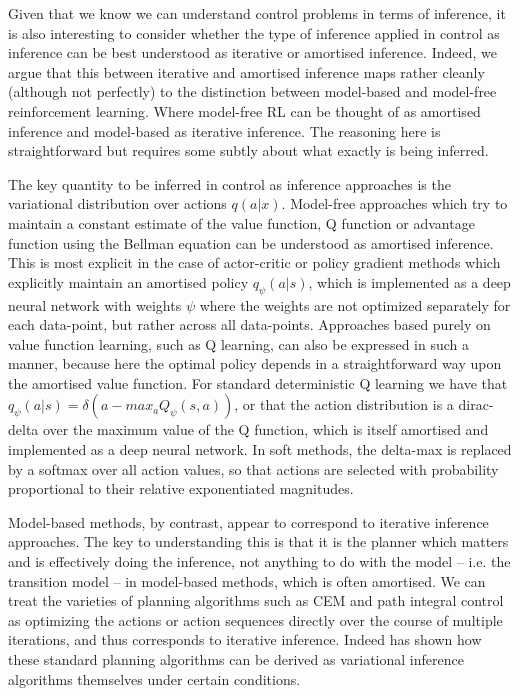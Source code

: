 Given that we know we can understand control problems in terms of inference, it is also interesting to consider whether the type of inference applied in control as inference can be best understood as iterative or amortised inference. Indeed, we argue that this between iterative and amortised inference maps rather cleanly (although not perfectly) to the distinction between model-based and model-free reinforcement learning. Where model-free RL can be thought of as amortised inference and model-based as iterative inference. The reasoning here is straightforward but requires some subtly about what exactly is being inferred. 

The key quantity to be inferred in control as inference approaches is the variational distribution over actions $q(a | x)$. Model-free approaches which try to maintain a constant estimate of the value function, Q function or advantage function using the Bellman equation can be understood as amortised inference. This is most explicit in the case of actor-critic or policy gradient methods which explicitly maintain an amortised policy $q_\psi(a | s)$, which is implemented as a deep neural network with weights $\psi$ where the weights are not optimized separately for each data-point, but rather across all data-points. Approaches based purely on value function learning, such as Q learning, can also be expressed in such a manner, because here the optimal policy depends in a straightforward way upon the amortised value function. For standard deterministic Q learning we have that $q_\psi(a | s) = \delta(a - max_a Q_\psi(s,a))$, or that the action distribution is a dirac-delta over the maximum value of the Q function, which is itself amortised and implemented as a deep neural network. In soft methods, the delta-max is replaced by a softmax over all action values, so that actions are selected with probability proportional to their relative exponentiated magnitudes. 

Model-based methods, by contrast, appear to correspond to iterative inference approaches. The key to understanding this is that it is the planner which matters and is effectively doing the inference, not anything to do with the model -- i.e. the transition model -- in model-based methods, which  is often amortised. We can treat the varieties of planning algorithms such as CEM and path integral control as optimizing the actions or action sequences directly over the course of multiple iterations, and thus corresponds to iterative inference. Indeed \citet{okada_variational_2019} has shown how these standard planning algorithms can be derived as variational inference algorithms themselves under certain conditions.

